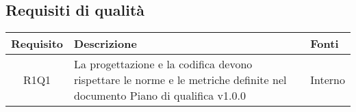 \begin{center}
\begin{longtable}{|c|p{10cm}|p{4cm}|}
	\end{longtable}
\end{center}
\subsection{Requisiti di qualità}
\begin{center}
	\begin{longtable}{|c|p{10cm}|p{4cm}|}
		\hline
		\rowcolor{lighter-grayer}
		\textbf{Requisito} & \textbf{Descrizione} & \textbf{Fonti}  \\
		\hline
		\endfirsthead
		
		 R1Q1 &La progettazione e la codifica devono rispettare le norme e le metriche definite nel documento Piano di qualifica v1.0.0 & Interno\\
		\hline
		
	\end{longtable}
\end{center}
